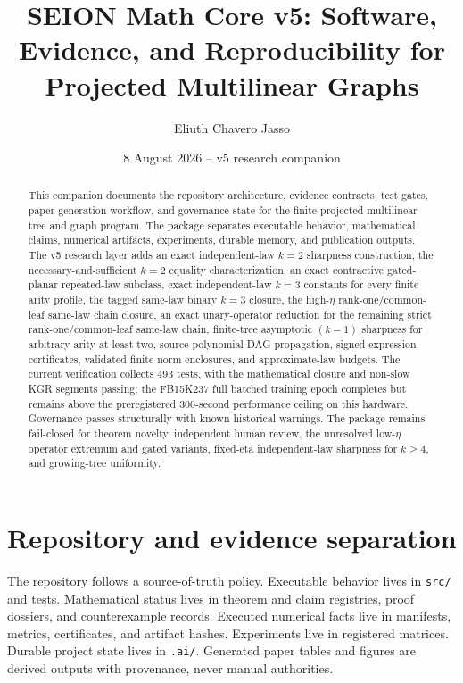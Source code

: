\documentclass[11pt]{amsart}
\title[SEION Math Core v5 software]{SEION Math Core v5: Software, Evidence, and Reproducibility for Projected Multilinear Graphs}
\author{Eliuth Chavero Jasso}
\date{8 August 2026 -- v5 research companion}
\begin{document}
\begin{abstract}
This companion documents the repository architecture, evidence contracts, test gates, paper-generation workflow, and governance state for the finite projected multilinear tree and graph program. The package separates executable behavior, mathematical claims, numerical artifacts, experiments, durable memory, and publication outputs. The v5 research layer adds an exact independent-law $k=2$ sharpness construction, the necessary-and-sufficient $k=2$ equality characterization, an exact contractive gated-planar repeated-law subclass, exact independent-law $k=3$ constants for every finite arity profile, the tagged same-law binary $k=3$ closure, the high-$\eta$ rank-one/common-leaf same-law chain closure, an exact unary-operator reduction for the remaining strict rank-one/common-leaf same-law chain, finite-tree asymptotic $(k-1)$ sharpness for arbitrary arity at least two, source-polynomial DAG propagation, signed-expression certificates, validated finite norm enclosures, and approximate-law budgets. The current verification collects 493 tests, with the mathematical closure and non-slow KGR segments passing; the FB15K237 full batched training epoch completes but remains above the preregistered 300-second performance ceiling on this hardware. Governance passes structurally with known historical warnings. The package remains fail-closed for theorem novelty, independent human review, the unresolved low-$\eta$ operator extremum and gated variants, fixed-eta independent-law sharpness for $k\ge4$, and growing-tree uniformity.\end{abstract}
\maketitle

\section{Repository and evidence separation}

The repository follows a source-of-truth policy. Executable behavior lives in
\texttt{src/} and tests. Mathematical status lives in theorem and claim
registries, proof dossiers, and counterexample records. Executed numerical
facts live in manifests, metrics, certificates, and artifact hashes.
Experiments live in registered matrices. Durable project state lives in
\texttt{.ai/}. Generated paper tables and figures are derived outputs with
provenance, never manual authorities.
\end{document}
